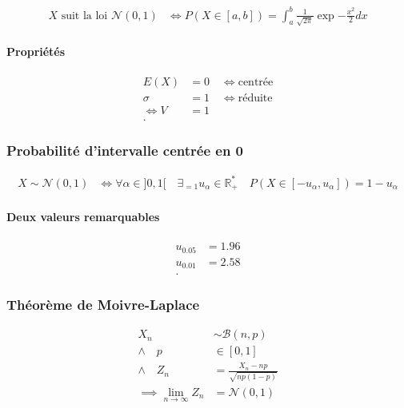 \documentclass{article}
\newcommand{\R}{\mathds{R}}
\begin{document}
\begin{equation*}
    \begin{split}
        \text{$X$ suit la loi $\mathcal{N}(0, 1)$} &\iff P(X \in [a, b]) = \int_a^b \frac{1}{\sqrt{2\pi}} \exp{-\frac{x^2}{2}} dx
    \end{split}
\end{equation*}

\paragraph{Propriétés}
\begin{align*}
	E(X) &= 0 \quad\iff\text{centrée}\\
	\sigma &= 1 \quad\iff\text{réduite}\\
	\iff V &= 1 \\
.\end{align*}

\subsubsection{Probabilité d'intervalle centrée en 0}

\begin{equation*}
    \begin{split}
        X \sim \mathcal{N}(0, 1) &\iff \forall \alpha \in ]0, 1[ \quad \exists_{=1} u_\alpha \in \R_+^\ast \quad P(X \in [-u_\alpha, u_\alpha]) = 1 - u_\alpha
    \end{split}
\end{equation*}

\paragraph{Deux valeurs remarquables}

\begin{align*}
	u_{0.05} &= 1.96 \\
	u_{0.01} &= 2.58 \\
.\end{align*}


\subsubsection{Théorème de Moivre-Laplace}
\begin{align*}
	X_n &\sim \mathcal{B}(n, p) \\
	\land\quad p &\in [0, 1] \\
	\land\quad Z_n &= \frac{X_n-np}{\sqrt{np(1-p)} } \\
	\implies \lim_{n \to \infty} Z_n &= \mathcal N(0, 1) \\
\end{align*}
\end{document}
